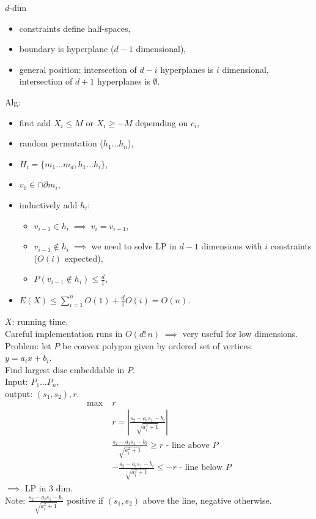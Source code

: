 \documentclass[a4paper, 12pt]{book}
\theoremstyle{definition}
\theoremstyle{remark}
\begin{document}
$d$-dim
\begin{itemize}
  \item constraints define half-spaces,
  \item boundary is hyperplane ($d-1$ dimensional),
  \item general position: intersection of $d-i$ hyperplanes is $i$ dimensional,
    intersection of $d+1$ hyperplanes is $\emptyset$.
\end{itemize}
Alg:
\begin{itemize}[label={}]
  \item first add $X_i \leq M$ or $X_i \geq -M$ depemding on $c_i$,
  \item random permutation ($h_1 \dots h_n$),
  \item $H_i = \{m_1 \dots m_d, h_1 \dots h_i\}$,
  \item $v_0 \in \cap \partial m_i$,
  \item inductively add $h_i$:
    \begin{itemize}[label={}]
      \item $v_{i-1} \in h_i \; \implies \; v_i = v_{i-1}$,
      \item $v_{i-1} \notin h_i \; \implies$
        we need to solve LP in $d-1$ dimensions with $i$ constraints ($O(i)$ expected),
      \item $P(v_{i-1} \notin h_i) \leq \frac{d}{i}$,
    \end{itemize}
  \item $E(X) \leq \sum_{i=1}^{n} O(1) + \frac{d}{i} O(i) = O(n)$.
\end{itemize}
$X$: running time. \\
Careful implementation runs in $O(d! \, n) \; \implies$ very useful for low dimensions. \\
Problem: let $P$ be convex polygon given by ordered set of vertices \\
$y = a_i x + b_i$. \\
Find largest disc embeddable in $P$. \\
Input: $P_1 \dots P_n$, \\
output: $(s_1, s_2), r$.
\begin{align*}
  \max \; &r \\
  &r = \left| \frac{s_2 - a_i s_1 - b_i}{\sqrt{a_i^2 + 1}}\right| \\
  &\frac{s_2 - a_i s_1 - b_i}{\sqrt{a_i^2 + 1}} \geq r \text{ - line above } P \\
  &-\frac{s_2 - a_i s_1 - b_i}{\sqrt{a_i^2 + 1}} \leq -r \text{ - line below } P
\end{align*}
$\implies$ LP in 3 dim. \\
Note: $\frac{s_2 - a_i s_1 - b_i}{\sqrt{a_i^2 + 1}}$ positive if $(s_1, s_2)$ above the line,
negative otherwise.
\end{document}
